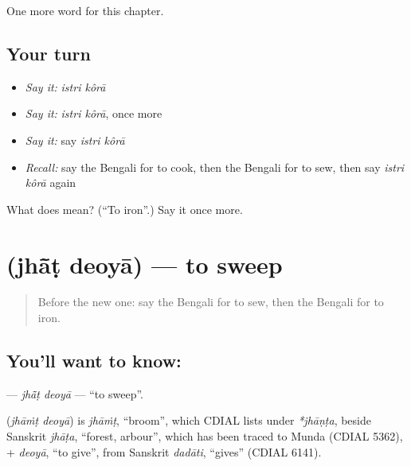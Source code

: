 \begin{grammarlens}[title={What you've built}]
One more word for this chapter.
\end{grammarlens}

\subsection*{Your turn}
\begin{itemize}
\raggedright
  \item \emph{Say it:} \emph{istri kôrā}
  \item \emph{Say it:} \emph{istri kôrā}, once more
  \item \emph{Say it:} say \emph{istri kôrā}
  \item \emph{Recall:} say the Bengali for to cook, then the Bengali for to sew, then say \emph{istri kôrā} again
\end{itemize}

\begin{tcolorbox}[breakable,colback=teal!4,colframe=teal!35!black,title={Before you move on}]
What does   mean? (\textquotedblleft{}To iron\textquotedblright{}.) Say it once more.
\end{tcolorbox}
\section[\texorpdfstring{\bn{ঝাঁট} \bn{দেওয়া} (jhā̃ṭ deoyā)}{ঝাঁট দেওয়া (jhā̃ṭ deoyā)}]{  (jhā̃ṭ deoyā) — to sweep}

\label{lesson:BN-C148-jhat-deoya}



\begin{quote}
Before the new one: say the Bengali for to sew, then the Bengali for to iron.
\end{quote}

\subsection*{You'll want to know:  }
\textbf{ } — \emph{jhā̃ṭ deoyā} — \textquotedblleft{}to sweep\textquotedblright{}.

\begin{cousinweb}
\textbf{ } (\emph{jhāṁṭ deoyā}) is \emph{jhāṁṭ}, \textquotedblleft{}broom\textquotedblright{}, which CDIAL lists under \emph{*jhāṇṭa}, beside Sanskrit \emph{jhāṭa}, \textquotedblleft{}forest, arbour\textquotedblright{}, which has been traced to Munda (CDIAL 5362), + \emph{deoyā}, \textquotedblleft{}to give\textquotedblright{}, from Sanskrit \emph{dadāti}, \textquotedblleft{}gives\textquotedblright{} (CDIAL 6141).
\end{cousinweb}

